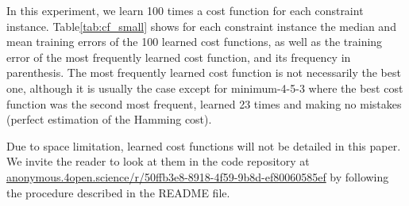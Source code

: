 \documentclass{article}
\begin{document}

In  this experiment,  we  learn 100  times a  cost  function for  each
constraint instance. Table\ref{tab:cf_small} shows for each constraint
instance the median  and mean training errors of the  100 learned cost
functions,  as well  as  the  training error  of  the most  frequently
learned  cost function,  and its  frequency in  parenthesis. The  most
frequently  learned cost  function is  not necessarily  the best  one,
although it  is usually  the case except  for minimum-4-5-3  where the
best cost function was the second  most frequent, learned 23 times and
making no mistakes (perfect estimation of the Hamming cost).

Due to space  limitation, learned cost functions will  not be detailed
in this  paper.  We  invite the  reader to  look at  them in  the code
repository                                                          at
\href{https://anonymous.4open.science/r/50ffb3e8-8918-4f59-9b8d-ef80060585ef/}{anonymous.4open.science/r/50ffb3e8-8918-4f59-9b8d-ef80060585ef}
by following the procedure described in the README file.




\end{document}
